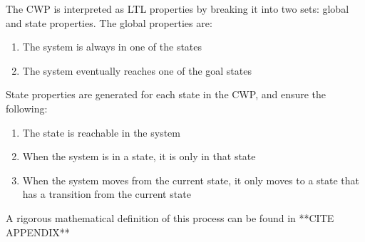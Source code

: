 
The CWP is interpreted as LTL properties by breaking it into two sets: global and state properties. The global properties are:
\begin{enumerate}
    \item The system is always in one of the states
    \item The system eventually reaches one of the goal states
\end{enumerate}

State properties are generated for each state in the CWP, and ensure the following:
\begin{enumerate}
    \item The state is reachable in the system
    \item When the system is in a state, it is only in that state
    \item When the system moves from the current state, it only moves to a state that has a transition from the current state
\end{enumerate}

A rigorous mathematical definition of this process can be found in **CITE APPENDIX**
